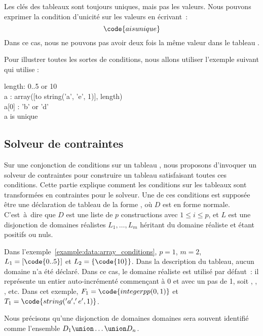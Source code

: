 Les clés des tableaux sont toujours uniques, mais pas les valeurs. Nous pouvons
exprimer la condition d'unicité sur les valeurs en écrivant~:
%
$$\code{a is unique}$$
%
Dans ce cas, nous ne pouvons pas avoir deux fois la même valeur dans le tableau
.

\begin{example}
\label{example:data:array_conditions}
Pour illustrer toutes les sortes de conditions, nous allons utiliser l'exemple
suivant qui utilise :

\begin{pre}
length: 0..5 or 10 \\
a     : array([to string('a', 'e', 1)], length) \\
a[0]  : 'b' or 'd' \\
a is unique
\end{pre}

\end{example}

\subsection{Solveur de contraintes}

Sur une conjonction de conditions sur un tableau , nous proposons
d'invoquer un solveur de contraintes pour construire un tableau satisfaisant
toutes ces conditions. Cette partie explique comment les conditions sur les
tableaux sont transformées en contraintes pour le solveur. Une de ces conditions
est supposée être une déclaration de tableau de la forme , où $D$ est en forme normale. C'est~à~dire que $D$ est une liste de $p$
constructions  avec $1 \leq i \leq p$, et $L$ est une
disjonction de domaines réalistes $L_1, \dots, L_m$ héritant du domaine réaliste
 et étant positifs ou nuls.

Dans l'exemple~\ref{example:data:array_conditions}, $p = 1$, $m = 2$, $L_1 =
[\code{0..5}]$ et $L_2 = \{\code{10}\}$. Dans la description du tableau, aucun
domaine n'a été déclaré. Dans ce cas, le domaine réaliste 
est utilisé par défaut~: il représente un entier auto-incrémenté commençant à 0
et avec un pas de 1, soit , , ,  etc. Dans cet
exemple, $F_1 = \code{integerpp(0, 1)}$ et $T_1 = \code{string('a', 'e', 1)}$.

Nous précisons qu'une disjonction de domaines domaines  sera souvent identifié comme l'ensemble $D_1 \union \dots \union D_n$.

